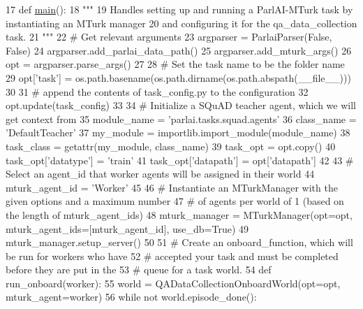 \begin{DoxyCode}
17 \textcolor{keyword}{def }\hyperlink{namespaceprojects_1_1wizard__of__wikipedia_1_1mturk__evaluation__task_1_1run_ad3ab2c71f8083c3112815c0b363d316b}{main}():
18     \textcolor{stringliteral}{"""}
19 \textcolor{stringliteral}{    Handles setting up and running a ParlAI-MTurk task by instantiating an MTurk manager}
20 \textcolor{stringliteral}{    and configuring it for the qa\_data\_collection task.}
21 \textcolor{stringliteral}{    """}
22     \textcolor{comment}{# Get relevant arguments}
23     argparser = ParlaiParser(\textcolor{keyword}{False}, \textcolor{keyword}{False})
24     argparser.add\_parlai\_data\_path()
25     argparser.add\_mturk\_args()
26     opt = argparser.parse\_args()
27 
28     \textcolor{comment}{# Set the task name to be the folder name}
29     opt[\textcolor{stringliteral}{'task'}] = os.path.basename(os.path.dirname(os.path.abspath(\_\_file\_\_)))
30 
31     \textcolor{comment}{# append the contents of task\_config.py to the configuration}
32     opt.update(task\_config)
33 
34     \textcolor{comment}{# Initialize a SQuAD teacher agent, which we will get context from}
35     module\_name = \textcolor{stringliteral}{'parlai.tasks.squad.agents'}
36     class\_name = \textcolor{stringliteral}{'DefaultTeacher'}
37     my\_module = importlib.import\_module(module\_name)
38     task\_class = getattr(my\_module, class\_name)
39     task\_opt = opt.copy()
40     task\_opt[\textcolor{stringliteral}{'datatype'}] = \textcolor{stringliteral}{'train'}
41     task\_opt[\textcolor{stringliteral}{'datapath'}] = opt[\textcolor{stringliteral}{'datapath'}]
42 
43     \textcolor{comment}{# Select an agent\_id that worker agents will be assigned in their world}
44     mturk\_agent\_id = \textcolor{stringliteral}{'Worker'}
45 
46     \textcolor{comment}{# Instantiate an MTurkManager with the given options and a maximum number}
47     \textcolor{comment}{# of agents per world of 1 (based on the length of mturk\_agent\_ids)}
48     mturk\_manager = MTurkManager(opt=opt, mturk\_agent\_ids=[mturk\_agent\_id], use\_db=\textcolor{keyword}{True})
49     mturk\_manager.setup\_server()
50 
51     \textcolor{comment}{# Create an onboard\_function, which will be run for workers who have}
52     \textcolor{comment}{# accepted your task and must be completed before they are put in the}
53     \textcolor{comment}{# queue for a task world.}
54     \textcolor{keyword}{def }run\_onboard(worker):
55         world = QADataCollectionOnboardWorld(opt=opt, mturk\_agent=worker)
56         \textcolor{keywordflow}{while} \textcolor{keywordflow}{not} world.episode\_done():

\end{DoxyCode}
